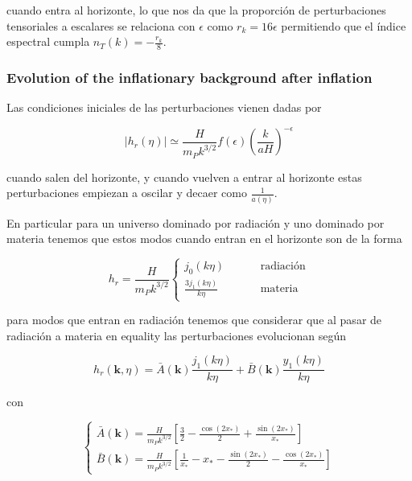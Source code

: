 \noindent
cuando entra al horizonte, lo que nos da que la proporción de perturbaciones tensoriales a escalares se relaciona con $\epsilon$ como $r_k = 16 \epsilon$ permitiendo que el índice espectral cumpla $n_T (k) = - \displaystyle \frac{r_k}{8}$.

\subsubsection{Evolution of the inflationary background after inflation}

Las condiciones iniciales de las perturbaciones vienen dadas por

\begin{equation}
    \left| h_r (\eta) \right| \simeq \frac{H}{m_P k^{3/2}} f(\epsilon) \left(\frac{k}{aH} \right)^{- \epsilon}
\end{equation}

\noindent
cuando salen del horizonte, y cuando vuelven a entrar al horizonte estas perturbaciones empiezan a oscilar y decaer como $\displaystyle \frac{1}{a (\eta)}$.

En particular para un universo dominado por radiación y uno dominado por materia tenemos que estos modos cuando entran en el horizonte son de la forma

\begin{equation}
    h_r = \frac{H}{m_P k^{3/2}} \begin{cases}
        \displaystyle j_0 (k \eta) \hspace{1cm} &\text{radiación}\\
        \displaystyle \frac{3 j_1 (k \eta)}{k \eta} \hspace{1cm} &\text{materia}
    \end{cases}
\end{equation}

\noindent
para modos que entran en radiación tenemos que considerar que al pasar de radiación a materia en equality las perturbaciones evolucionan según

\begin{equation}
    h_r (\textbf{k},\eta) = \bar{A} (\textbf{k}) \frac{j_1 (k\eta)}{k \eta} + \bar{B} (\textbf{k}) \frac{y_1 (k \eta)}{k \eta}
\end{equation}

\noindent
con 

\begin{equation}
    \begin{cases} 
        \displaystyle \bar{A} (\textbf{k}) = \frac{H}{m_P k^{3/2}} \left[ \frac{3}{2} - \frac{\cos (2 x_*)}{2} + \frac{\sin (2 x_*)}{x_*} \right]\\
        
        \displaystyle \bar{B} (\textbf{k}) = \frac{H}{m_P k^{3/2}} \left[ \frac{1}{x_*} - x_* -\frac{\sin (2 x_*)}{2} - \frac{\cos (2x_*)}{x_*} \right]
    \end{cases}
\end{equation}

